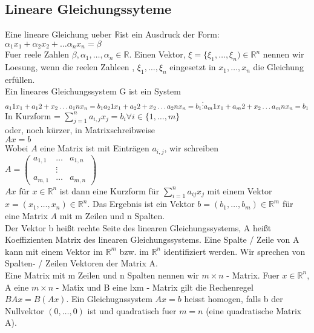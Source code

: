 \documentclass{article}
\newcommand{\R}{\mathbb{R}}
\newcommand{\mR}{$\mathbb{R}$}
\newcommand{\Rn}{\mathbb{R}^n}
\begin{document}
\subsection{Lineare Gleichungssyteme}
Eine lineare Gleichung ueber \mR ist ein Ausdruck der Form:\\
$
\alpha_1x_1 + \alpha_2 x_2 + \dots \alpha_n x_n = \beta$\\
Fuer reele Zahlen $\beta, \alpha_1, \dots, \alpha_n \in \R$. Einen Vektor, $\xi = \{\xi_1, \dots, \xi_n) \in \Rn$ nennen wir Loesung, wenn die reelen Zahleen  , $\xi_1, \dots, \xi_n$ eingesetzt in $x_1, \dots, x_n$ die Gleichung erfüllen.\\
Ein lineares Gleichungssystem G ist ein System \\
$
a_11 x_1 + a_12 + x_2 \dots a_1n x_n = b_1\\
a_21 x_1 + a_22 + x_2 \dots a_2n x_n = b_1\\
\vdots\\
a_m1 x_1 + a_m2 + x_2 \dots a_mn x_n = b_1\\
$\\
In Kurzform = $\sum_{j=1}^n a_{i,j} x_j = b_i \forall i\in\{1,\dots,m\}$\\
oder, noch kürzer, in Matrixschreibweise\\
$Ax=b$\\
Wobei $A$ eine Matrix ist mit Einträgen $a_{i,j}$, wir schreiben\\
$
A =
\begin{pmatrix}
a_{1, 1} & \dots & a_{1, n}\\
 & \vdots\\
a_{m, 1} & \dots & a_{m, n}
\end{pmatrix}
$\\
$Ax$ für $x \in \Rn$ ist dann eine Kurzform für $\sum_{i=1}^na_{ij}x_j$ mit einem Vektor $x = (x_1, \dots, x_n) \in \Rn$. Das Ergebnis ist ein Vektor $b = (b_1, \dots, b_m) \in \R^m$ für eine Matrix $A$ mit m Zeilen und n Spalten.\\
Der Vektor b hei\ss{}t rechte Seite des linearen Gleichungssystems, A hei\ss{}t Koeffizienten Matrix des linearen Gleichungssystems. Eine Spalte / Zeile von A kann mit einem Vektor im $\R^m$ bzw. im $\R^n$ identifiziert werden. Wir sprechen von Spalten- / Zeilen Vektoren der Matrix A.\\
Eine Matrix mit m Zeilen und n Spalten nennen wir $m\times n$ - Matrix. Fuer $x  \in \Rn $, A eine $m\times n$ - Matix und B eine lxm - Matrix gilt die Rechenregel $BAx = B(Ax)$. Ein Gleichugnssystem $Ax=b$ heisst homogen, falls b der Nullvektor $(0, \dots, 0)$ ist und quadratisch fuer $m = n$ (eine quadratische Matrix A).\\
\end{document}
